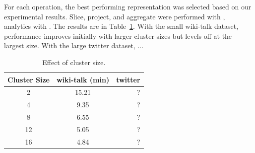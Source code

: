 For each operation, the best performing representation was selected
based on our experimental results.  Slice, project, and aggregate were
performed with \ve, analytics with \hg.  The results are in
Table~\ref{tab:clustersize}.  With the small wiki-talk dataset,
performance improves initially with larger cluster sizes but levels
off at the largest size.  With the large twitter dataset, ...

\begin{table}
\caption{Effect of cluster size.}
\small
\begin{tabular}{| c | c | r |}
\hline
\multicolumn{1}{|c|}{\bfseries Cluster Size} & \multicolumn{1}{c|}{\bfseries wiki-talk (min)} & \multicolumn{1}{r|}{\bfseries twitter} \\ \hline
2 & 15.21 & ? \\ \hline
4 & 9.35 & ? \\ \hline
8 & 6.55 & ? \\ \hline
12 & 5.05 & ? \\ \hline
16 & 4.84 & ? \\ \hline
\end{tabular}
\label{tab:clustersize}
\end{table}
